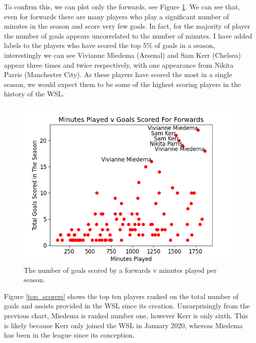 \documentclass[12pt, a4paper, twocolumn]{article}
\begin{document}
To confirm this, we can plot only the forwards, see Figure \ref{goal_min_fw}. We can see that, even for forwards there are many players who play a significant number of minutes in the season and score very few goals. In fact, for the majority of player the number of goals appears uncorrelated to the number of minutes. I have added labels to the players who have scored the top 5\% of goals in a season, interestingly we can see Vivianne Miedema (Arsenal) and Sam Kerr (Chelsea) appear three times and twice respectively, with one appearance from Nikita Parris (Manchester City). As these players have scored the most in a single season, we would expect them to be some of the highest scoring players in the history of the WSL.

\begin{figure}
  \includegraphics[width=\linewidth]{../vis/playerStats/goal_minutes_forwards.png}
  \caption{The number of goals scored by a forwards v minutes played per season.}
  \label{goal_min_fw}
\end{figure}

Figure \ref{top_scorers} shows the top ten players ranked on the total number of goals and assists provided in the WSL since its creation. Unsurprisingly from the previous chart, Miedema is ranked number one, however Kerr is only sixth. This is likely because Kerr only joined the WSL in January 2020, whereas Miedema has been in the league since its conception. 
\end{document}
